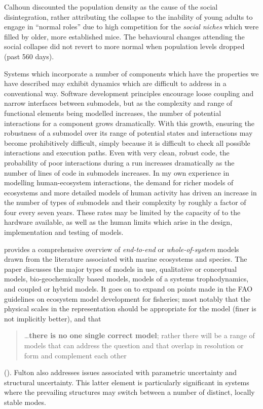 Calhoun discounted the population density as the cause of the social
disintegration, rather attributing the collapse to the inability of
young adults to engage in ``normal roles'' due to high competition for
the \emph{social niches} which were filled by older, more established
mice. The behavioural changes attending the social collapse did not revert
to more normal when population levels dropped (past 560 days).

Systems which incorporate a number of components which have the
properties we have described may exhibit dynamics which are difficult
to address in a conventional way. Software development principles
encourage loose coupling and narrow interfaces between submodels, but
as the complexity and range of functional elements being modelled
increases, the number of potential interactions for a component grows
dramatically.  With this growth, ensuring the robustness of a submodel
over its range of potential states and interactions may become
prohibitively difficult, simply because it is difficult to check all
possible interactions and execution paths.  Even with very clean,
robust code, the probability of poor interactions during a run
increases dramatically as the number of lines of code in submodels
increases. In my own experience in modelling human-ecosystem
interactions, the demand for richer models of ecosystems and more
detailed models of human activity has driven an increase in the number
of types of submodels and their complexity by roughly a factor of four
every seven years. These rates may be limited by the
capacity of to the hardware available, as well as the human limits which
arise in the design, implementation and testing of models.

\Cite{fulton2010approaches} provides a comprehensive overview
of \emph{end-to-end} or \emph{whole-of-system} models drawn from the
literature associated with marine ecosystems and species. 
The paper discusses the major types of models in use, qualitative or
conceptual models, bio-geochemically based models, models of a systems
trophodynamics, and coupled or hybrid models. It goes on to expand on
points made in the FAO guidelines on ecosystem model development for
fisheries; most notably that the physical scales in the representation
should be appropriate for the model (finer is not implicitly better), and
that
\begin{quote}
   \ldots\textbf{there is no one single correct model}; rather there
   will be a range of models that can address the question and that
   overlap in resolution or form and complement each other
\end{quote} (\cite{FAO2008ecosystems}).
Fulton also addresses issues associated with parametric uncertainty
and structural uncertainty.  This latter element is particularly
significant in systems where the prevailing structures may switch
between a number of distinct, locally stable modes.


